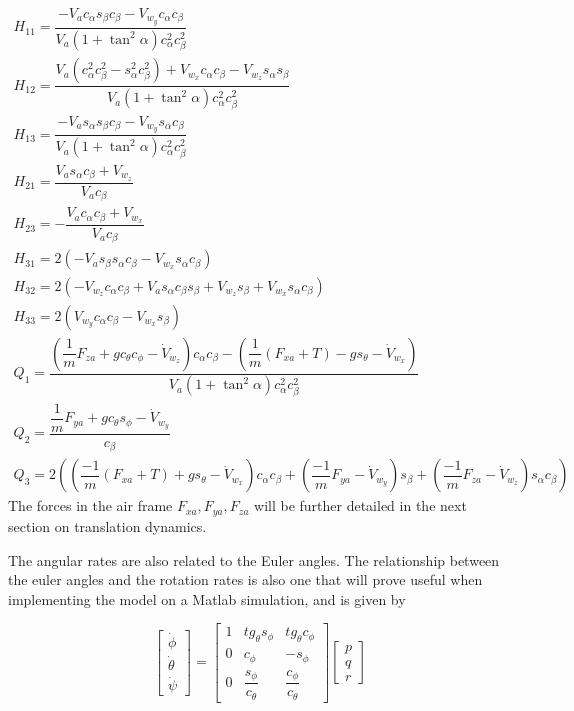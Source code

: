 \begin{gather*}
H_{11}=\dfrac{-V_a c_\alpha s_\beta  c_\beta - V_{w_y} c_\alpha c_\beta}{V_a(1+\tan^2\alpha)c^2_\alpha c^2_\beta}\\
H_{12}=\dfrac{V_a(c^2_\alpha c^2_\beta-s^2_\alpha c^2_\beta) + V_{w_x}c_\alpha c_\beta - V_{w_z}s_\alpha s_\beta}{V_a(1+\tan^2\alpha)c^2_\alpha c^2_\beta}\\
H_{13}=\dfrac{-V_a s_\alpha s_\beta  c_\beta - V_{w_y} s_\alpha c_\beta}{V_a(1+\tan^2\alpha)c^2_\alpha c^2_\beta}\\
H_{21}=\dfrac{V_a s_\alpha c_\beta + V_{w_z}}{V_a c_\beta}\\
H_{23}=-\dfrac{V_a c_\alpha c_\beta + V_{w_x}}{V_a c_\beta}\\
H_{31}=2 \left(-V_a s_\beta s_\alpha c_\beta - V_{w_x} s_\alpha c_\beta \right)\\
H_{32}=2\left( -V_{w_z} c_\alpha c_\beta + V_as_\alpha c_\beta s_\beta
 + V_{w_z}s_\beta + V_{w_x}s_\alpha c_\beta \right)\\
H_{33}=2\left(V_{w_y}c_\alpha c_\beta - V_{w_x}s_\beta\right)\\
Q_1=\dfrac{\left(\dfrac{1}{m}F_{za} + gc_\theta c_\phi - \dot{V}_{w_z} \right)c_\alpha c_\beta - \left(\dfrac{1}{m}(F_{xa} + T)-gs_\theta - \dot{V}_{w_x}\right)}{V_a(1+\tan^2\alpha)c^2_\alpha c^2_\beta}\\
Q_2=\dfrac{\dfrac{1}{m}F_{ya}+g c_\theta s_\phi-\dot{V}_{w_y}}{c_\beta}\\
Q_3=2 \left( \left(\dfrac{-1}{m}(F_{xa}+T) + g s_\theta - \dot{V}_{w_x} \right)c_\alpha c_\beta + \left( \dfrac{-1}{m}F_{ya} - \dot{V}_{w_y} \right)s_\beta + \left(\dfrac{-1}{m}F_{za} - \dot{V}_{w_z} \right)s_\alpha c_\beta \right)
\end{gather*}
The forces in the air frame $F_{xa}, F_{ya}, F_{za}$ will be further detailed in the next section on translation dynamics. 

The angular rates are also related to the Euler angles. The relationship between the euler angles and the rotation rates is also one that will prove useful when implementing the model on a Matlab simulation, and is given by

\begin{equation}
\begin{bmatrix}
\dot{\phi}\\
\dot{\theta}\\
\dot{\psi}
\end{bmatrix}
=
\begin{bmatrix}
1 & tg_\theta s_\phi & tg_\theta c_\phi\\
0 & c_\phi & -s_\phi\\
0 & \dfrac{s_\phi}{c_\theta} & \dfrac{c_\phi}{c_\theta}
\end{bmatrix}
\begin{bmatrix}
p\\
q\\
r
\end{bmatrix}
\label{eq:euler2omega}
\end{equation}

